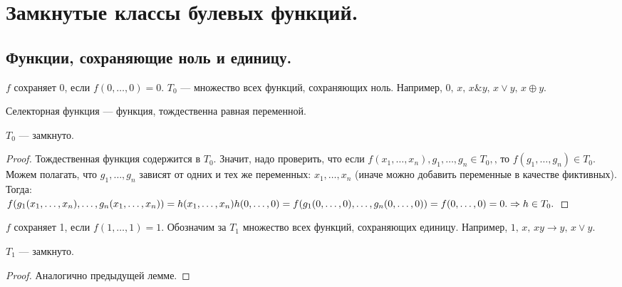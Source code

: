 \section{Замкнутые классы булевых функций.}
\subsection{Функции, сохраняющие ноль и единицу.}
\begin{definition}
	$f$ сохраняет 0, если $f(0,\ldots, 0)=0$.
	$T_0$ --- множество всех функций, сохраняющих ноль. Например, $0,\,x,\,x \& y,\, x \vee y,\, x \oplus y$.
\end{definition}
\begin{definition}
	Селекторная функция --- функция, тождественна равная переменной. 
\end{definition}
\begin{lemma}
	$T_0 $ --- замкнуто. 
\end{lemma}
\begin{proof}
	Тождественная функция содержится в $T_0$. Значит, надо проверить, что если $f(x_1,\ldots, x_n),g_1, \ldots, g_n \in T_0, \text{, то~} f(g_1, \ldots, g_n) \in T_0.$ \\
	Можем полагать, что $g_1, \ldots, g_n$ зависят от одних и тех же переменных: $x_1, \ldots, x_n$ (иначе можно добавить переменные в качестве фиктивных). Тогда:\\
	$f(g_1(x_1, \ldots, x_n),\ldots, g_n(x_1, \ldots, x_n))=h(x_1, \ldots, x_n) \\
	h(0, \ldots, 0)=f(g_1(0,\ldots,0),\ldots,g_n(0, \ldots, 0))=f(0,\ldots,0)=0. \Rightarrow h \in T_0. 
$
\end{proof}
\begin{definition}
	$f$ сохраняет 1, если $f(1,\ldots, 1)=1$.
	Обозначим за $T_1$ множество всех функций, сохраняющих единицу. Например, $1,\,x,\,xy\rightarrow y, \,x \vee y$.
\end{definition}
\begin{lemma}
	$T_1 $ --- замкнуто. 
\end{lemma}
\begin{proof}
	Аналогично предыдущей лемме. 
\end{proof}
